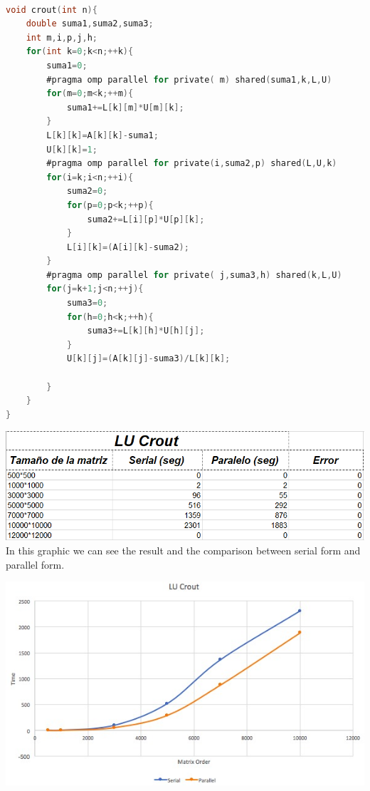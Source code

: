 \documentclass{article}
\newcounter{subsubsubsection}[subsubsection]
\begin{document}

\begin{lstlisting}[language=C]

void crout(int n){
    double suma1,suma2,suma3;
    int m,i,p,j,h;
    for(int k=0;k<n;++k){
        suma1=0;
        #pragma omp parallel for private( m) shared(suma1,k,L,U)
        for(m=0;m<k;++m){
            suma1+=L[k][m]*U[m][k];
        }
        L[k][k]=A[k][k]-suma1;
        U[k][k]=1;
        #pragma omp parallel for private(i,suma2,p) shared(L,U,k)
        for(i=k;i<n;++i){
            suma2=0;
            for(p=0;p<k;++p){
                suma2+=L[i][p]*U[p][k];
            }
            L[i][k]=(A[i][k]-suma2);
        }
        #pragma omp parallel for private( j,suma3,h) shared(k,L,U)
        for(j=k+1;j<n;++j){
            suma3=0;
            for(h=0;h<k;++h){
                suma3+=L[k][h]*U[h][j];
            }
            U[k][j]=(A[k][j]-suma3)/L[k][k];
         
        }
    }
}

\end{lstlisting}


\includegraphics[width=\linewidth]{./images/crout.PNG}\\
In this graphic we can see the result and the comparison between serial form and parallel form.


\includegraphics[width=\linewidth]{./images/glucr.jpeg}\\
\end{document}
